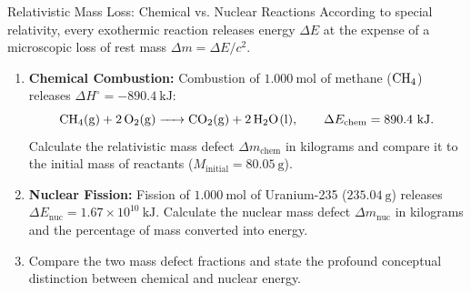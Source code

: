 \begin{exercise}{Relativistic Mass Loss: Chemical vs. Nuclear Reactions}
According to special relativity, every exothermic reaction releases energy $\Delta E$ at the expense of a microscopic loss of rest mass $\Delta m = \Delta E / c^2$.
\begin{enumerate}[leftmargin=1.5em,itemsep=2pt]
  \item \textbf{Chemical Combustion:} Combustion of $1.000\ \mathrm{mol}$ of methane ($\ce{CH4}$) releases $\Delta H^\circ = -890.4\ \mathrm{kJ}$:
  \[
  \ce{CH4(g) + 2 O2(g) -> CO2(g) + 2 H2O(l)}, \qquad \Delta E_{\text{chem}} = 890.4\ \mathrm{kJ}.
  \]
  Calculate the relativistic mass defect $\Delta m_{\text{chem}}$ in kilograms and compare it to the initial mass of reactants ($M_{\text{initial}} = 80.05\ \mathrm{g}$).
  \item \textbf{Nuclear Fission:} Fission of $1.000\ \mathrm{mol}$ of Uranium-235 ($235.04\ \mathrm{g}$) releases $\Delta E_{\text{nuc}} = 1.67 \times 10^{10}\ \mathrm{kJ}$.
  Calculate the nuclear mass defect $\Delta m_{\text{nuc}}$ in kilograms and the percentage of mass converted into energy.
  \item Compare the two mass defect fractions and state the profound conceptual distinction between chemical and nuclear energy.
\end{enumerate}
\end{exercise}

\begin{tabletworkspace}[5.0cm]
\end{tabletworkspace}


